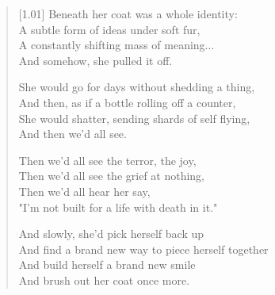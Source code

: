 \begin{verse}[1.01\textwidth]
Beneath her coat was a whole identity:\\
A subtle form of ideas under soft fur,\\
A constantly shifting mass of meaning...\\
And somehow, she pulled it off.

She would go for days without shedding a thing,\\
And then, as if a bottle rolling off a counter,\\
She would shatter, sending shards of self flying,\\
And then we'd all see.

Then we'd all see the terror, the joy,\\
Then we'd all see the grief at nothing,\\
Then we'd all hear her say,\\
"I'm not built for a life with death in it."

And slowly, she'd pick herself back up\\
And find a brand new way to piece herself together\\
And build herself a brand new smile\\
And brush out her coat once more.
\end{verse}
